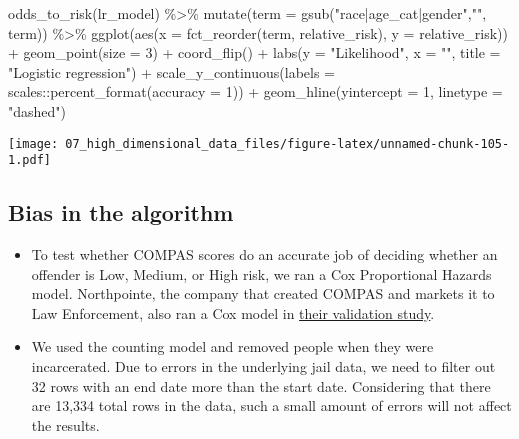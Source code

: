 \documentclass[
]{book}
\newenvironment{Shaded}{\begin{snugshade}}{\end{snugshade}}
\newcommand{\AttributeTok}[1]{\textcolor[rgb]{0.77,0.63,0.00}{#1}}
\newcommand{\DecValTok}[1]{\textcolor[rgb]{0.00,0.00,0.81}{#1}}
\newcommand{\FunctionTok}[1]{\textcolor[rgb]{0.00,0.00,0.00}{#1}}
\newcommand{\NormalTok}[1]{#1}
\newcommand{\SpecialCharTok}[1]{\textcolor[rgb]{0.00,0.00,0.00}{#1}}
\newcommand{\StringTok}[1]{\textcolor[rgb]{0.31,0.60,0.02}{#1}}
\begin{document}
\begin{Shaded}
\begin{Highlighting}[]
\FunctionTok{odds\_to\_risk}\NormalTok{(lr\_model) }\SpecialCharTok{\%\textgreater{}\%}
    \FunctionTok{mutate}\NormalTok{(}\AttributeTok{term =} \FunctionTok{gsub}\NormalTok{(}\StringTok{"race|age\_cat|gender"}\NormalTok{,}\StringTok{""}\NormalTok{, term)) }\SpecialCharTok{\%\textgreater{}\%} 
    \FunctionTok{ggplot}\NormalTok{(}\FunctionTok{aes}\NormalTok{(}\AttributeTok{x =} \FunctionTok{fct\_reorder}\NormalTok{(term, relative\_risk), }\AttributeTok{y =}\NormalTok{ relative\_risk)) }\SpecialCharTok{+}
        \FunctionTok{geom\_point}\NormalTok{(}\AttributeTok{size =} \DecValTok{3}\NormalTok{) }\SpecialCharTok{+}
        \FunctionTok{coord\_flip}\NormalTok{() }\SpecialCharTok{+}
        \FunctionTok{labs}\NormalTok{(}\AttributeTok{y =} \StringTok{"Likelihood"}\NormalTok{, }\AttributeTok{x =} \StringTok{""}\NormalTok{,}
             \AttributeTok{title =} \StringTok{"Logistic regression"}\NormalTok{) }\SpecialCharTok{+}
        \FunctionTok{scale\_y\_continuous}\NormalTok{(}\AttributeTok{labels =}\NormalTok{ scales}\SpecialCharTok{::}\FunctionTok{percent\_format}\NormalTok{(}\AttributeTok{accuracy =} \DecValTok{1}\NormalTok{)) }\SpecialCharTok{+}
        \FunctionTok{geom\_hline}\NormalTok{(}\AttributeTok{yintercept =} \DecValTok{1}\NormalTok{, }\AttributeTok{linetype =} \StringTok{"dashed"}\NormalTok{)}
\end{Highlighting}
\end{Shaded}

\texttt{[image: 07\_high\_dimensional\_data\_files/figure-latex/unnamed-chunk-105-1.pdf]}

\hypertarget{bias-in-the-algorithm}{%
\subsection{Bias in the algorithm}\label{bias-in-the-algorithm}}

\begin{itemize}
\item
  To test whether COMPAS scores do an accurate job of deciding whether an offender is Low, Medium, or High risk, we ran a Cox Proportional Hazards model. Northpointe, the company that created COMPAS and markets it to Law Enforcement, also ran a Cox model in \href{https://journals.sagepub.com/doi/abs/10.1177/0093854808326545}{their validation study}.
\item
  We used the counting model and removed people when they were incarcerated. Due to errors in the underlying jail data, we need to filter out 32 rows with an end date more than the start date. Considering that there are 13,334 total rows in the data, such a small amount of errors will not affect the results.
\end{itemize}
\end{document}
